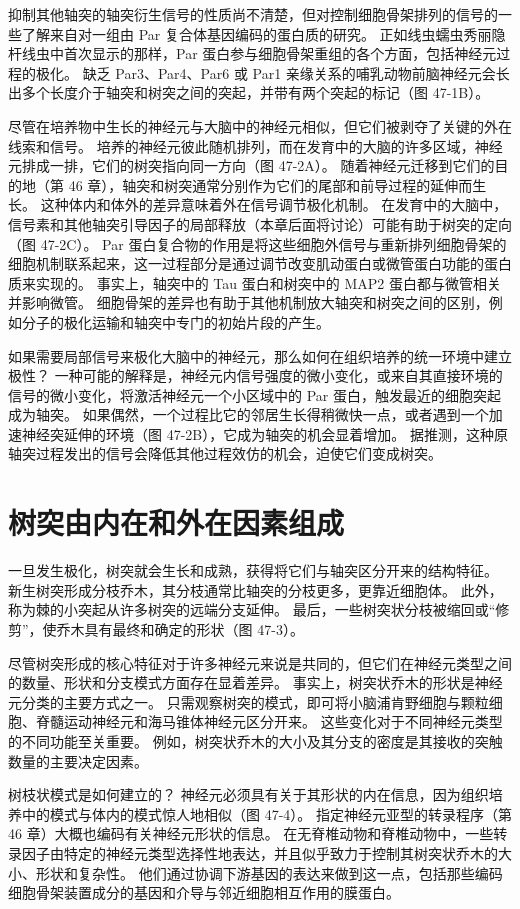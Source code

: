 抑制其他轴突的轴突衍生信号的性质尚不清楚，但对控制细胞骨架排列的信号的一些了解来自对一组由 Par 复合体基因编码的蛋白质的研究。 正如线虫蠕虫秀丽隐杆线虫中首次显示的那样，Par 蛋白参与细胞骨架重组的各个方面，包括神经元过程的极化。 缺乏 Par3、Par4、Par6 或 Par1 亲缘关系的哺乳动物前脑神经元会长出多个长度介于轴突和树突之间的突起，并带有两个突起的标记（图 47-1B）。

尽管在培养物中生长的神经元与大脑中的神经元相似，但它们被剥夺了关键的外在线索和信号。 培养的神经元彼此随机排列，而在发育中的大脑的许多区域，神经元排成一排，它们的树突指向同一方向（图 47-2A）。 随着神经元迁移到它们的目的地（第 46 章），轴突和树突通常分别作为它们的尾部和前导过程的延伸而生长。 这种体内和体外的差异意味着外在信号调节极化机制。 在发育中的大脑中，信号素和其他轴突引导因子的局部释放（本章后面将讨论）可能有助于树突的定向（图 47-2C）。 Par 蛋白复合物的作用是将这些细胞外信号与重新排列细胞骨架的细胞机制联系起来，这一过程部分是通过调节改变肌动蛋白或微管蛋白功能的蛋白质来实现的。 事实上，轴突中的 Tau 蛋白和树突中的 MAP2 蛋白都与微管相关并影响微管。 细胞骨架的差异也有助于其他机制放大轴突和树突之间的区别，例如分子的极化运输和轴突中专门的初始片段的产生。

如果需要局部信号来极化大脑中的神经元，那么如何在组织培养的统一环境中建立极性？ 一种可能的解释是，神经元内信号强度的微小变化，或来自其直接环境的信号的微小变化，将激活神经元一个小区域中的 Par 蛋白，触发最近的细胞突起成为轴突。 如果偶然，一个过程比它的邻居生长得稍微快一点，或者遇到一个加速神经突延伸的环境（图 47-2B），它成为轴突的机会显着增加。 据推测，这种原轴突过程发出的信号会降低其他过程效仿的机会，迫使它们变成树突。

\section{树突由内在和外在因素组成}
一旦发生极化，树突就会生长和成熟，获得将它们与轴突区分开来的结构特征。 新生树突形成分枝乔木，其分枝通常比轴突的分枝更多，更靠近细胞体。 此外，称为棘的小突起从许多树突的远端分支延伸。 最后，一些树突状分枝被缩回或“修剪”，使乔木具有最终和确定的形状（图 47-3）。

尽管树突形成的核心特征对于许多神经元来说是共同的，但它们在神经元类型之间的数量、形状和分支模式方面存在显着差异。 事实上，树突状乔木的形状是神经元分类的主要方式之一。 只需观察树突的模式，即可将小脑浦肯野细胞与颗粒细胞、脊髓运动神经元和海马锥体神经元区分开来。 这些变化对于不同神经元类型的不同功能至关重要。 例如，树突状乔木的大小及其分支的密度是其接收的突触数量的主要决定因素。

树枝状模式是如何建立的？ 神经元必须具有关于其形状的内在信息，因为组织培养中的模式与体内的模式惊人地相似（图 47-4）。 指定神经元亚型的转录程序（第 46 章）大概也编码有关神经元形状的信息。 在无脊椎动物和脊椎动物中，一些转录因子由特定的神经元类型选择性地表达，并且似乎致力于控制其树突状乔木的大小、形状和复杂性。 他们通过协调下游基因的表达来做到这一点，包括那些编码细胞骨架装置成分的基因和介导与邻近细胞相互作用的膜蛋白。

